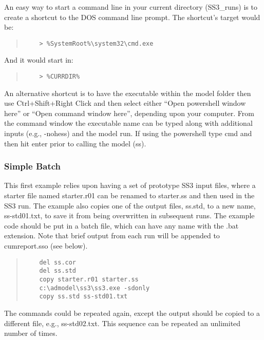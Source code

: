 An easy way to start a command line in your current directory (SS3\_runs) is to create a shortcut to the DOS command line prompt. The shortcut's target would be:

\begin{quote}
	\begin{verbatim}
	> %SystemRoot%\system32\cmd.exe
	\end{verbatim}
\end{quote}


\noindent And it would start in:
\begin{quote}
	\begin{verbatim}
	> %CURRDIR%
	\end{verbatim}
\end{quote}

An alternative shortcut is to have the executable within the model folder then use Ctrl+Shift+Right Click and then select either ``Open powershell window here'' or ``Open command window here'', depending upon your computer. From the command window the executable name can be typed along with additional inputs (e.g., -nohess) and the model run. If using the powershell type cmd and then hit enter prior to calling the model (ss). 


\subsubsection{Simple Batch}

This first example relies upon having a set of prototype SS3 input files, where a starter file named starter.r01 can be renamed to starter.ss and then used in the SS3 run. The example also copies one of the output files, ss.std, to a new name, ss-std01.txt, to save it from being overwritten in subsequent runs. The example code should be put in a batch file, which can have any name with the .bat extension. Note that brief output from each run will be appended to cumreport.sso (see below).

\begin{quote}
	\begin{verbatim}
	del ss.cor
	del ss.std
	copy starter.r01 starter.ss
	c:\admodel\ss3\ss3.exe -sdonly
	copy ss.std ss-std01.txt
	\end{verbatim}
\end{quote}

The commands could be repeated again, except the output should be copied to a different file, e.g., ss-std02.txt. This sequence can be repeated an unlimited number of times.

